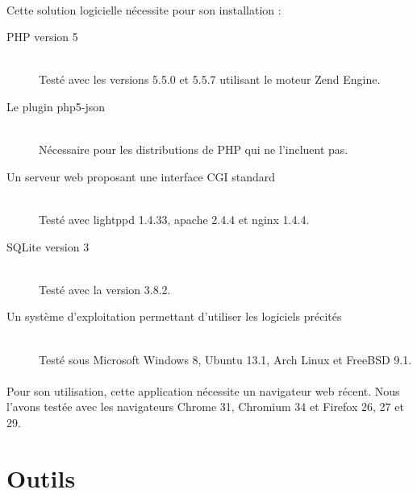     \paragraph{}
        Cette solution logicielle nécessite pour son installation :
        \begin{description}
            \item[PHP version 5]\hfill \\
                Testé avec les versions 5.5.0 et 5.5.7 utilisant le moteur
                Zend Engine.
            \item[Le plugin php5-json]\hfill \\
                Nécessaire pour les distributions de PHP qui ne l'incluent pas.
            \item[Un serveur web proposant une interface CGI standard]\hfill \\
                Testé avec lightppd 1.4.33, apache 2.4.4 et nginx 1.4.4.
            \item[SQLite version 3]\hfill \\
                Testé avec la version 3.8.2.
            \item[Un système d'exploitation permettant d'utiliser les logiciels précités]\hfill \\
                Testé sous Microsoft Windows 8, Ubuntu 13.1, Arch Linux et
                FreeBSD 9.1.
        \end{description}

    \paragraph{}
        Pour son utilisation, cette application nécessite un navigateur web
        récent. Nous l'avons testée avec les navigateurs Chrome 31, Chromium
        34 et Firefox 26, 27 et 29.

\pagebreak
\section{Outils}
